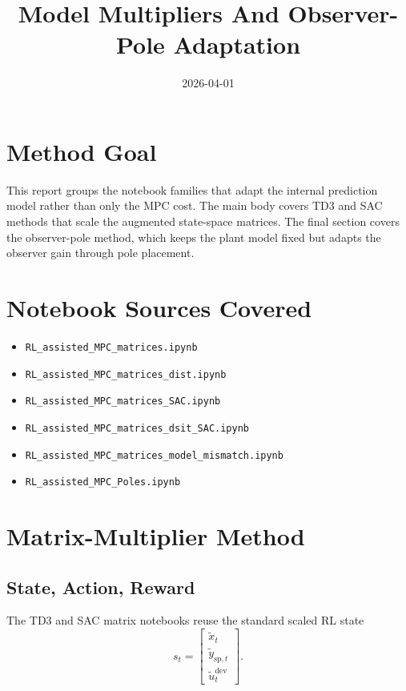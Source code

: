 \documentclass[11pt]{article}
\title{Model Multipliers And Observer-Pole Adaptation}
\date{2026-04-01}
\begin{document}
\maketitle

\section*{Method Goal}

This report groups the notebook families that adapt the internal prediction
model rather than only the MPC cost. The main body covers TD3 and SAC methods
that scale the augmented state-space matrices. The final section covers the
observer-pole method, which keeps the plant model fixed but adapts the observer
gain through pole placement.

\section*{Notebook Sources Covered}

\begin{itemize}
\item \texttt{RL\_assisted\_MPC\_matrices.ipynb}
\item \texttt{RL\_assisted\_MPC\_matrices\_dist.ipynb}
\item \texttt{RL\_assisted\_MPC\_matrices\_SAC.ipynb}
\item \texttt{RL\_assisted\_MPC\_matrices\_dsit\_SAC.ipynb}
\item \texttt{RL\_assisted\_MPC\_matrices\_model\_mismatch.ipynb}
\item \texttt{RL\_assisted\_MPC\_Poles.ipynb}
\end{itemize}

\section*{Matrix-Multiplier Method}

\subsection*{State, Action, Reward}

The TD3 and SAC matrix notebooks reuse the standard scaled RL state
\[
s_t =
\begin{bmatrix}
\tilde{x}_{t} \\
\tilde{y}_{\mathrm{sp},t} \\
\tilde{u}_{t}^{\mathrm{dev}}
\end{bmatrix}.
\]
\end{document}
